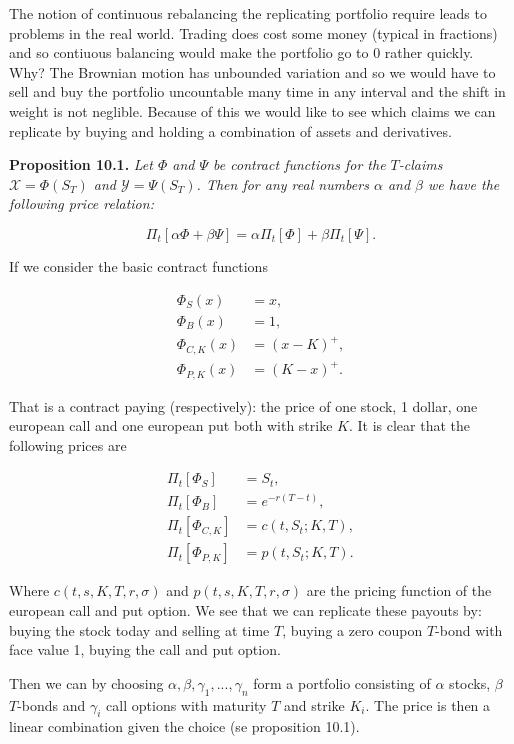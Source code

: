 \documentclass[
]{article}
\begin{document}
The notion of continuous rebalancing the replicating portfolio require
leads to problems in the real world. Trading does cost some money
(typical in fractions) and so contiuous balancing would make the
portfolio go to 0 rather quickly. Why? The Brownian motion has unbounded
variation and so we would have to sell and buy the portfolio uncountable
many time in any interval and the shift in weight is not neglible.
Because of this we would like to see which claims we can replicate by
buying and holding a combination of assets and derivatives.

\textbf{Proposition 10.1.} \emph{Let \(\Phi\) and \(\Psi\) be contract
functions for the \(T\)-claims \(\mathcal{X}=\Phi(S_T)\) and
\(\mathcal{Y}=\Psi(S_T)\). Then for any real numbers \(\alpha\) and
\(\beta\) we have the following price relation:}

\[
\Pi_t[\alpha \Phi + \beta\Psi]=\alpha \Pi_t[\Phi]+\beta\Pi_t[\Psi].\tag{10.1}
\]

If we consider the basic contract functions

\begin{align*}
\Phi_S(x)&=x,\tag{10.2}\\
\Phi_B(x)&=1,\tag{10.3}\\
\Phi_{C,K}(x)&=(x-K)^+,\tag{10.4}\\
\Phi_{P,K}(x)&=(K-x)^+.
\end{align*}

That is a contract paying (respectively): the price of one stock, 1
dollar, one european call and one european put both with strike \(K\).
It is clear that the following prices are

\begin{align*}
\Pi_t[\Phi_S]&=S_t,\tag{10.5}\\
\Pi_t[\Phi_B]&=e^{-r(T-t)},\tag{10.6}\\
\Pi_t[\Phi_{C,K}]&=c(t,S_t;K,T),\tag{10.7}\\
\Pi_t[\Phi_{P,K}]&=p(t,S_t;K,T).
\end{align*}

Where \(c(t,s,K,T,r,\sigma)\) and \(p(t,s,K,T,r,\sigma)\) are the
pricing function of the european call and put option. We see that we can
replicate these payouts by: buying the stock today and selling at time
\(T\), buying a zero coupon \(T\)-bond with face value 1, buying the
call and put option.

Then we can by choosing \(\alpha,\beta,\gamma_1,...,\gamma_n\) form a
portfolio consisting of \(\alpha\) stocks, \(\beta\) \(T\)-bonds and
\(\gamma_i\) call options with maturity \(T\) and strike \(K_i\). The
price is then a linear combination given the choice (se proposition
10.1).
\end{document}
